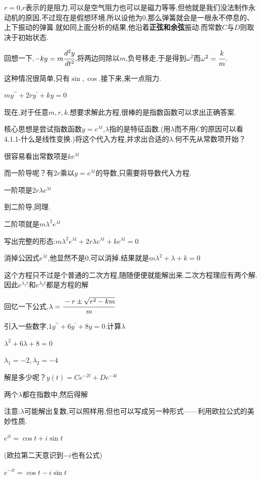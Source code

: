 \documentclass[UTF8,12pt]{ctexbook}
\newcommand{\derivative}{^\prime}
\newcommand{\doubleDerivative}{^{\prime\prime}}
\begin{document}
{{{{$r = 0$,$r$表示的是阻力,可以是空气阻力也可以是磁力等等,但他就是我们没法制作永动机的原因,不过现在是假想环境,所以设他为0,那么弹簧就会是一根永不停息的、上下振动的弹簧.就如同上面分析的结果,他沿着{\bfseries 正弦和余弦}振动.而常数$C$与$D$则取决于初始状态.

回想一下,$-ky = m\cfrac{d^2y}{dt^2}$,将两边同除以$m$,负号移走,于是得到$\omega^2$而$\omega^2 = \cfrac{k}{m}$.

这种情况很简单,只有$\sin , \cos$.接下来,来一点阻力.

$my\doubleDerivative + 2ry\derivative + ky = 0$

现在,对于任意$m,r,k$.想要求解此方程,很棒的是指数函数可以求出正确答案.

核心思想是尝试指数函数$y = e^{\lambda t}$,$\lambda$指的是特征函数.(用$\lambda$而不用$C$的原因可以看4.1.1-什么是线性变换.)将这个代入方程,并求出合适的$\lambda$.何不先从常数项开始？

很容易看出常数项是$ke^{\lambda t}$

而一阶导呢？有$2r$乘以$y = e^{\lambda t}$的导数,只需要将导数代入方程.

一阶项是$2r\lambda e^{\lambda t}$

到二阶导,同理.

二阶项就是$m\lambda^2e^{\lambda t}$

写出完整的形态:$m\lambda^2e^{\lambda t} + 2r\lambda e^{\lambda t} + ke^{\lambda t} = 0$

消掉公因式$e^{\lambda t}$,他显然不是0,可以消掉.结果就是$m\lambda^2 + \lambda + k= 0$

这个方程只不过是个普通的二次方程,随随便便就能解出来.二次方程理应有两个解.因此$e^{\lambda_1 t}$和$e^{\lambda_2 t}$都是方程的解

回忆一下公式,$\lambda = \cfrac{-r \pm \sqrt{r^2 - km}}{m}$

引入一些数字,$1y\doubleDerivative + 6y\derivative + 8y = 0$.计算$\lambda$

$\lambda^2 + 6\lambda + 8 = 0$

$\lambda_1 = -2, \lambda_2 = -4$

解是多少呢？$y(t) = Ce^{-2t} + De^{-4t}$

两个$\lambda$都在指数中,然后得解

注意:$\lambda$可能解出复数,可以照样用,但也可以写成另一种形式——利用欧拉公式的美妙性质.

$e^{it} = \cos t + i\sin t$

(欧拉第二天意识到$-i$也有公式)

$e^{-it} = \cos t -i\sin t$

}}}}
\end{document}
